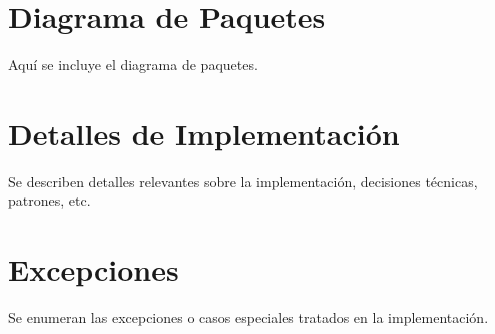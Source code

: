 \documentclass[a4paper,12pt]{article}
\begin{document}
\section{Diagrama de Paquetes}
Aquí se incluye el diagrama de paquetes.

\section{Detalles de Implementación}
Se describen detalles relevantes sobre la implementación, decisiones técnicas, patrones, etc.

\section{Excepciones}
Se enumeran las excepciones o casos especiales tratados en la implementación.
\end{document}
